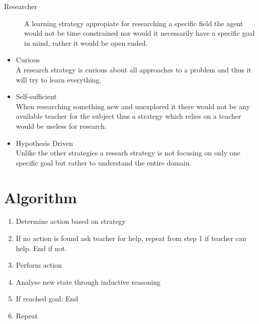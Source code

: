 \documentclass[master.tex]{subfiles}
\begin{document}
    \begin{description}
    \item [{Researcher}] A learning strategy appropiate for researching a specific
    field the agent would not be time constrained nor would it necessarily
    have a specific goal in mind, rather it would be open ended.\end{description}
    \begin{itemize}
    \item Curious\\
    A research strategy is curious about all approaches to a problem and
    thus it will try to learn everything.
    \item Self-sufficient\\
    When researching something new and unexplored it there would not be
    any available teacher for the subject thus a strategy which relies
    on a teacher would be useless for research.
    \item Hypothesis Driven\\
    Unlike the other strategies a researh strategy is not focusing on
    only one specific goal but rather to understand the entire domain.
    \end{itemize}

    \section*{Algorithm}
    \begin{enumerate}
    \item Determine action based on strategy
    \item If no action is found ask teacher for help, repeat from step 1 if
    teacher can help. End if not.
    \item Perform action
    \item Analyse new state through inductive reasoning
    \item If reached goal: End
    \item Repeat\end{enumerate}
\end{document}

